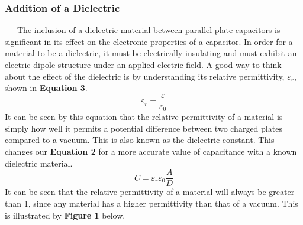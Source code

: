 \documentclass{article}
\begin{document}
\subsubsection*{Addition of a Dielectric}
\ \ \ The inclusion of a dielectric material between parallel-plate capacitors is significant in its effect on the electronic properties of a capacitor. In order for a material to be a dielectric, it must be electrically insulating and must exhibit an electric dipole structure under an applied electric field. A good way to think about the effect of the dielectric is by understanding its relative permittivity, $\varepsilon_r$, shown in \textbf{Equation 3}.
\begin{equation}
\varepsilon_r = \frac{\varepsilon}{\varepsilon_0}
\end{equation}
It can be seen by this equation that the relative permittivity of a material is simply how well it permits a potential difference between two charged plates compared to a vacuum. This is also known as the dielectric constant. This changes our \textbf{Equation 2} for a more accurate value of capacitance with a known dielectric material.
\begin{equation}
C = \varepsilon_r\varepsilon_0\frac{A}{D}
\end{equation}
It can be seen that the relative permittivity of a material will always be greater than 1, since any material has a higher permittivity than that of a vacuum. This is illustrated by \textbf{Figure 1} below.
\end{document}
